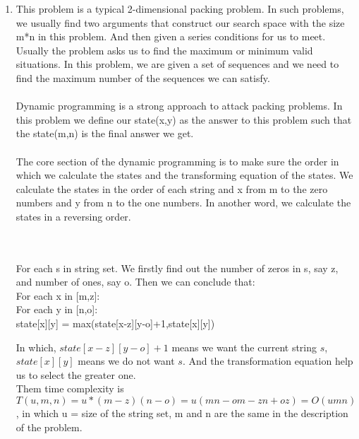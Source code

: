 \documentclass[12pt,a4paper]{article}
\makeatletter
\newtheorem*{solution}{Solution}
\renewenvironment{solution}[1][Solution] {\par\pushQED{\qed}\normalfont\topsep6\p@\@plus6\p@\relax\trivlist\item[\hskip\labelsep\bfseries#1\@addpunct{.}]\ignorespaces}{\popQED\endtrivlist\@endpefalse} \makeatother
\makeatother
\begin{document}
\begin{enumerate}








\begin{solution}
This problem is a typical 2-dimensional packing problem. In such problems, we usually find two arguments that construct our search space with the size m*n in this problem.  And then given a series conditions for us to meet. Usually the problem asks us to find the maximum or minimum valid situations. In this problem, we are given a set of sequences and we need to find the maximum number of the sequences we can satisfy.
~\\~\\
Dynamic programming is a strong approach to attack packing problems. In this problem we define our state(x,y) as the answer to this problem such that the state(m,n) is the final answer we get.
~\\~\\
The core section of the dynamic programming is to make sure the order in which we calculate the states and the transforming equation of the states.  We calculate the states in the order of each string and x from m to the zero numbers and y from n to the one numbers. In another word, we calculate the states in a reversing order.

~\\~\\
For each s in string set. We firstly find out the number of zeros in s, say z, and number of ones, say o. Then we can conclude that:~\\

For each x in [m,z]:~\\
	For each y in [n,o]:~\\
		state[x][y] = max(state[x-z][y-o]+1,state[x][y])

In which, $state[x-z][y-o]+1$ means we want the current string $s$, $state[x][y]$ means we do not want $s$. And the transformation equation help us to select the greater one. 
~\\
Them time complexity is~ $T(u,m,n) = u * (m-z)(n-o)=u(mn-om-zn+oz) = O(umn)$, in which u = size of the string set, m and n are the same in the description of the problem.



\end{solution}

~\\
~\\
~\\

\end{enumerate}
\end{document}
